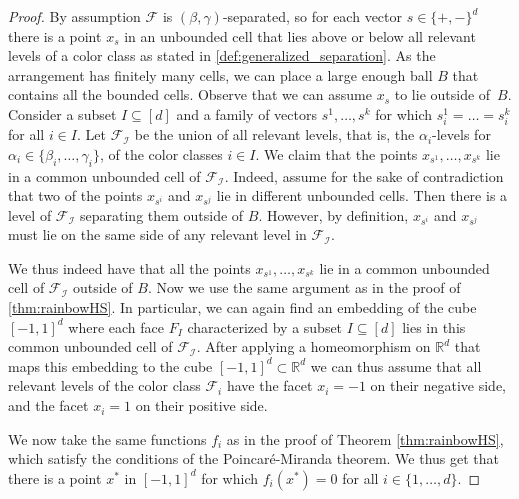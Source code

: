 \documentclass[10pt,a4paper]{amsart}
\begin{document}
\begin{proof}
By assumption $\mathcal{F}$ is $(\beta,\gamma)$-separated, so for each vector $s \in \{+, -\}^d$ there is a point $x_s$ in an unbounded cell that lies above or below all relevant levels of a color class as stated in \cref{def:generalized_separation}. As the arrangement has finitely many cells, we can place a large enough ball $B$ that contains all the bounded cells. Observe that we can assume $x_s$ to lie outside of~$B$. Consider a subset $I\subseteq [d]$ and a family of vectors $s^1,\ldots,s^k$ for which $s_i^1=\ldots =s_i^k$ for all $i\in I$. Let $\mathcal{F_{I}}$ be the union of all relevant levels, that is, the $\alpha_i$-levels for $\alpha_i \in \{\beta_i, \ldots, \gamma_i\}$, of the color classes $i \in I$. We claim that the points $x_{s^1},\ldots,x_{s^k}$ lie in a common unbounded cell of $\mathcal{F_{I}}$. Indeed, assume for the sake of contradiction that two of the points $x_{s^i}$ and $x_{s^j}$ lie in different unbounded cells. Then there is a level of $\mathcal{F_{I}}$ separating them outside of $B$. However, by definition, $x_{s^i}$ and $x_{s^j}$ must lie on the same side of any relevant level in $\mathcal{F_{I}}$.

We thus indeed have that all the points $x_{s^1},\ldots,x_{s^k}$ lie in a common unbounded cell of $\mathcal{F_{I}}$ outside of $B$. 
Now we use the same argument as in the proof of \cref{thm:rainbowHS}.
In particular, we can again find an embedding of the cube $[-1,1]^d$ where each face $F_I$ characterized by a subset $I \subseteq [d]$ 
lies in this common unbounded cell of $\mathcal{F_{I}}$. After applying a homeomorphism on $\mathbb{R}^d$ that maps this embedding to the cube $[-1,1]^d\subset\mathbb{R}^d$ we can thus assume that all relevant levels of the color class $\mathcal{F}_i$ have the facet $x_i=-1$ on their negative side, and the facet $x_i=1$ on their positive side.

We now take the same functions $f_i$ as in the proof of Theorem \ref{thm:rainbowHS}, which satisfy the conditions of the Poincar\'{e}-Miranda theorem.
We thus get that there is a point $x^*$ in $[-1,1]^d$ for which $f_i(x^*)=0$ for all $i\in\{1,\ldots,d\}$.
\end{proof}
\end{document}
